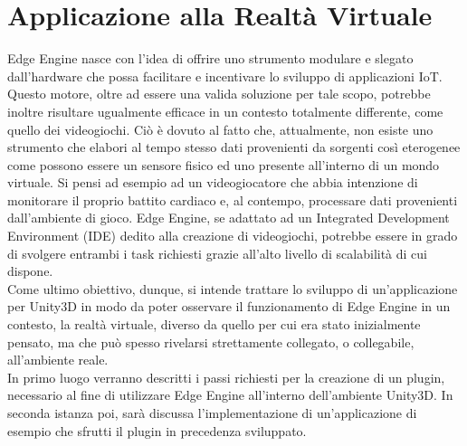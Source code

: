 \section{Applicazione alla Realtà Virtuale}
Edge Engine nasce con l’idea di offrire uno strumento modulare e slegato dall'hardware che possa facilitare e incentivare lo sviluppo di applicazioni IoT. Questo motore, oltre ad essere una valida soluzione per tale scopo, potrebbe inoltre risultare ugualmente efficace in un contesto totalmente differente, come quello dei videogiochi. Ciò è dovuto al fatto che, attualmente, non esiste uno strumento che elabori al tempo stesso dati provenienti da sorgenti così eterogenee come possono essere un sensore fisico ed uno presente all'interno di un mondo virtuale. Si pensi ad esempio ad un videogiocatore che abbia intenzione di monitorare il proprio battito cardiaco e, al contempo, processare dati provenienti dall’ambiente di gioco. Edge Engine, se adattato ad un Integrated Development Environment (IDE) dedito alla creazione di videogiochi, potrebbe essere in grado di svolgere entrambi i task richiesti grazie all’alto livello di scalabilità di cui dispone.\\
Come ultimo obiettivo, dunque, si intende trattare lo sviluppo di un’applicazione per Unity3D in modo da poter osservare il funzionamento di Edge Engine in un contesto, la realtà virtuale, diverso da quello per cui era stato inizialmente pensato, ma che può spesso rivelarsi strettamente collegato, o collegabile, all'ambiente reale.\\
In primo luogo verranno descritti i passi richiesti per la creazione di un plugin, necessario al fine di utilizzare Edge Engine all'interno dell'ambiente Unity3D. In seconda istanza poi, sarà discussa l'implementazione di un'applicazione di esempio che sfrutti il plugin in precedenza sviluppato.
